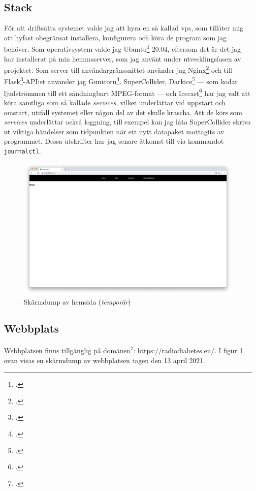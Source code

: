 \documentclass[11pt, a4paper]{article} %
\begin{document}
\subsection*{Stack}
För att driftsätta systemet valde jag att hyra en så kallad \gls{vps}, som tillåter mig att hyfast obegränsat installera, konfigurera och köra de program som jag behöver. Som operativsystem valde jag Ubuntu\footcite{noauthor_enterprise_nodate} 20.04, eftersom det är det jag har installerat på min hemmaserver, som jag använt under utvecklingsfasen av projektet. Som server till användargränssnittet använder jag Nginx\footcite{noauthor_nginx_nodate} och till Flask\footcite{noauthor_welcome_nodate}-API:et använder jag Gunicorn\footcite{noauthor_gunicorn_nodate}. SuperCollider, Darkice\footcite{noauthor_darkice_nodate} --- som kodar ljudströmmen till ett sändningbart MPEG-format --- och Icecast\footcite{noauthor_icecast_nodate} har jag valt att köra samtliga som så kallade \emph{services}, vilket underlättar vid uppstart och omstart, utifall systemet eller någon del av det skulle krascha. Att de körs som \emph{services} underlättar också loggning, till exempel kan jag låta SuperCollider skriva ut viktiga händelser som tidpunkten när ett nytt datapaket mottagits av programmet. Dessa utskrifter har jag senare åtkomst till via kommandot \texttt{journalctl}.


\begin{figure}[H]
\centering
\includegraphics[width=\textwidth]{../media/hemsida.png}
\caption{Skärmdump av hemsida (\emph{temporär})}
\label{hemsida}
\end{figure}


\subsection*{Webbplats}
Webbplatsen finns tillgänglig på domänen\footcite{jondell_radio_nodate}: \url{https://radiodiabetes.eu/}. I figur \ref{hemsida} ovan visas en skärmdump av webbplatsen tagen den 13 april 2021.
\end{document}
